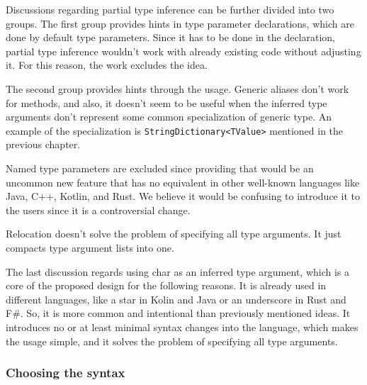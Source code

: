 Discussions regarding partial type inference can be further divided into two groups. 
The first group provides hints in type parameter declarations, which are done by default type parameters. 
Since it has to be done in the declaration, partial type inference wouldn’t work with already existing code without adjusting it.
For this reason, the work excludes the idea.
\par
The second group provides hints through the usage. 
Generic aliases
don’t work for methods, and also, it doesn’t seem to be useful when the inferred type arguments don’t represent some common specialization of generic type.  
An example of the specialization is \texttt{StringDictionary<TValue>} mentioned in the previous chapter.
\par
Named type parameters are excluded since providing that would be an uncommon new feature that has no equivalent in other well-known languages like Java, C++, Kotlin, and Rust. 
We believe it would be confusing to introduce it to the users since it is a controversial change.
\par
Relocation doesn’t solve the problem of specifying all type arguments. 
It just compacts type argument lists into one.
\par
The last discussion regards using char as an inferred type argument, which is a core of the proposed design for the following reasons. 
It is already used in different languages, like a star in Kolin and Java or an underscore in Rust and F\#. 
So, it is more common and intentional than previously mentioned ideas. 
It introduces no or at least minimal syntax changes into the language, which makes the usage simple, and it solves the problem of specifying all type arguments.

\subsubsection{Choosing the syntax}

